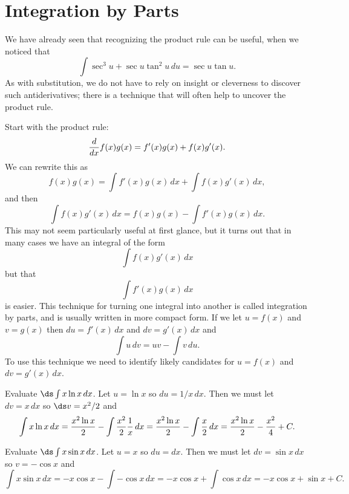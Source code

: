 \section{Integration by Parts}{}{}
\nobreak
We have already seen that recognizing the product rule can be useful,
when we noticed that
$$\int \sec^3u+\sec u \tan^2u\,du=\sec u \tan u.$$
As with substitution, we do not have to rely on insight or cleverness
to discover such antiderivatives; there is a technique that will often
help to uncover the product rule.

Start with the product rule:
$${d\over dx}f(x)g(x)=f'(x)g(x)+f(x)g'(x).$$
We can rewrite this as
$$f(x)g(x)=\int f'(x)g(x)\,dx +\int f(x)g'(x)\,dx,$$
and then
$$\int f(x)g'(x)\,dx=f(x)g(x)-\int f'(x)g(x)\,dx.$$
This may not seem particularly useful at first glance, but it turns
out that in many cases we have an integral of the form
$$\int f(x)g'(x)\,dx$$
but that 
$$\int f'(x)g(x)\,dx$$
is easier. This technique for turning one integral into another is
called {\dfont integration by parts\/},
and is usually written in more compact form. If we let $u=f(x)$ and
$v=g(x)$ then $du=f'(x)\,dx$ and $dv=g'(x)\,dx$ and 
$$\int u\,dv = uv-\int v\,du.$$
To use this technique we need to identify likely candidates for
$u=f(x)$ and $dv=g'(x)\,dx$.

\begin{example}
Evaluate $\ds\int x\ln x\,dx$. Let $u=\ln x$ so $du=1/x\,dx$. Then
we must let $dv=x\,dx$ so $\ds v=x^2/2$ and
$$
 \int x\ln x\,dx={x^2\ln x\over 2}-\int {x^2\over2}{1\over x}\,dx=
 {x^2\ln x\over 2}-\int {x\over2}\,dx={x^2\ln x\over 2}-{x^2\over4}+C.
$$
\vskip-10pt
\end{example}

\begin{example}
Evaluate $\ds\int x\sin x\,dx$. Let $u=x$ so $du=dx$. Then
we must let $dv=\sin x\,dx$ so $v=-\cos x$ and
$$\int x\sin x\,dx=-x\cos x-\int -\cos x\,dx=
-x\cos x+\int \cos x\,dx=-x\cos x+\sin x+C.$$
\vskip-10pt
\end{example}

